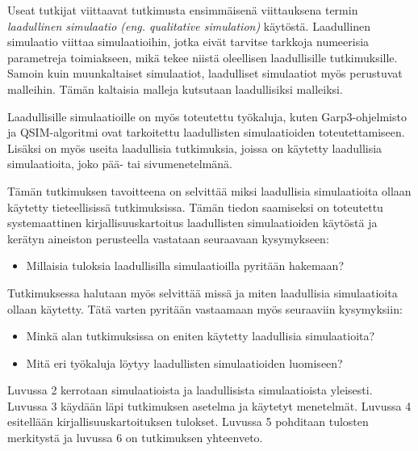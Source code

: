 \documentclass[utf8]{gradu3}
\begin{document}
Useat tutkijat viittaavat \textcite{kuipers1986qualitative} tutkimusta ensimmäisenä
viittauksena termin \textit{laadullinen simulaatio (eng. qualitative simulation)} 
käytöstä. Laadullinen simulaatio viittaa simulaatioihin, 
jotka eivät tarvitse tarkkoja numeerisia parametreja toimiakseen, 
mikä tekee niistä oleellisen laadullisille tutkimuksille. 
Samoin kuin muunkaltaiset simulaatiot, laadulliset simulaatiot myös perustuvat malleihin.
Tämän kaltaisia malleja kutsutaan laadullisiksi malleiksi.

Laadullisille simulaatioille on myös toteutettu työkaluja, kuten Garp3-ohjelmisto \parencite{bredeweg2007garp3} ja QSIM-algoritmi \parencite{helgstrand2004qsim} ovat tarkoitettu laadullisten simulaatioiden toteutettamiseen. Lisäksi on myös useita laadullisia tutkimuksia, joissa on käytetty laadullisia simulaatioita, joko pää- tai sivumenetelmänä.

Tämän tutkimuksen tavoitteena on selvittää miksi laadullisia simulaatioita 
ollaan käytetty tieteellisissä tutkimuksissa. Tämän tiedon saamiseksi on
toteutettu systemaattinen kirjallisuuskartoitus 
laadullisten simulaatioiden käytöstä ja kerätyn aineiston perusteella vastataan 
seuraavaan kysymykseen:
\begin{itemize}
    \item Millaisia tuloksia laadullisilla simulaatioilla pyritään hakemaan?
\end{itemize}

Tutkimuksessa halutaan myös selvittää missä ja miten laadullisia simulaatioita
ollaan käytetty. Tätä varten pyritään vastaamaan myös seuraaviin kysymyksiin:
\begin{itemize}
    \item Minkä alan tutkimuksissa on eniten käytetty laadullisia simulaatioita?
    \item Mitä eri työkaluja löytyy laadullisten simulaatioiden luomiseen?
\end{itemize}

Luvussa 2 kerrotaan simulaatioista ja laadullisista simulaatioista yleisesti. Luvussa 3 käydään läpi tutkimuksen asetelma ja käytetyt menetelmät. Luvussa 4 esitellään kirjallisuuskartoituksen tulokset. Luvussa 5 pohditaan tulosten merkitystä ja luvussa 6 on tutkimuksen yhteenveto.
\end{document}
